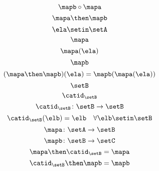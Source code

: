\begin{forslides}
    \begin{equation}
        \label{eq:slides_session2_134}
        \mapb \circ \mapa
    \end{equation}
    \begin{equation}
        \label{eq:slides_session2_135}
        \mapa \then \mapb
    \end{equation}
    \begin{equation}
        \label{eq:slides_session2_136}
        \ela \setin\setA
    \end{equation}
    \begin{equation}
        \label{eq:slides_session2_137}
        \mapa
    \end{equation}
    \begin{equation}
        \label{eq:slides_session2_138}
        \mapa(\ela)
    \end{equation}
    \begin{equation}
        \label{eq:slides_session2_139}
        \mapb
    \end{equation}
    \begin{equation}
        \label{eq:slides_session2_140}
        (\mapa \then \mapb)(\ela) = \mapb(\mapa(\ela))
    \end{equation}
    \begin{equation}
        \label{eq:slides_session2_141}
        \setB
    \end{equation}
    \begin{equation}
        \label{eq:slides_session2_142}
        \catid_\setB
    \end{equation}
    \begin{equation}
        \label{eq:slides_session2_142a}
        \catid_\setB \colon \setB \to \setB
    \end{equation}
    \begin{equation}
        \label{eq:slides_session2_143}
        \catid_\setB(\elb) = \elb \quad \forall  \elb \setin\setB
    \end{equation}
    \begin{equation}
        \label{eq:slides_session2_144}
        \mapa \colon \setA \to \setB
    \end{equation}
    \begin{equation}
        \label{eq:slides_session2_145}
        \mapb \colon \setB \to \setC
    \end{equation}
    \begin{equation}
        \label{eq:slides_session2_146}
        \mapa \then \catid_\setB = \mapa
    \end{equation}
    \begin{equation}
        \label{eq:slides_session2_147}
        \catid_\setB \then \mapb = \mapb
    \end{equation}


\end{forslides}

